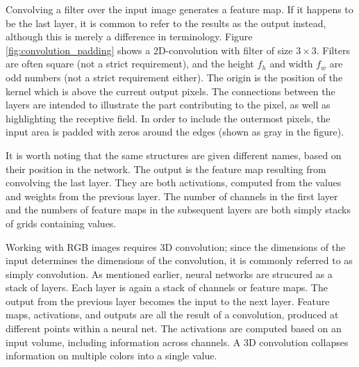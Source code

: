 
Convolving a filter over the input image generates a feature map. If it happens to be the last layer, it is common to refer to the results as the output instead, although this is merely a difference in terminology. Figure \ref{fig:convolution_padding} shows a 2D-convolution with filter of size $3\times 3$. Filters are often square (not a strict requirement), and the height $f_h$ and width $f_w$ are odd numbers (not a strict requirement either). The origin is the position of the kernel which is above the current output pixels. The connections between the layers are intended to illustrate the part contributing to the pixel, as well as highlighting the receptive field. In order to include the outermost pixels, the input area is padded with zeros around the edges (shown as gray in the figure). 

It is worth noting that the same structures are given different names, based on their position in the network. The output is the feature map resulting from convolving the last layer. They are both activations, computed from the values and weights from the previous layer. The number of channels in the first layer and the numbers of feature maps in the subsequent layers are both simply stacks of grids containing values.

Working with RGB images requires 3D convolution; since the dimensions of the input determines the dimensions of the convolution, it is commonly referred to as simply convolution. As mentioned earlier, neural networks are strucured as a stack of layers. Each layer is again a stack of channels or feature maps. The output from the previous layer becomes the input to the next layer. Feature maps, activations, and outputs are all the result of a convolution, produced at different points within a neural net. The activations are computed based on an input volume, including information across channels. A 3D convolution collapses information on multiple colors into a single value.

